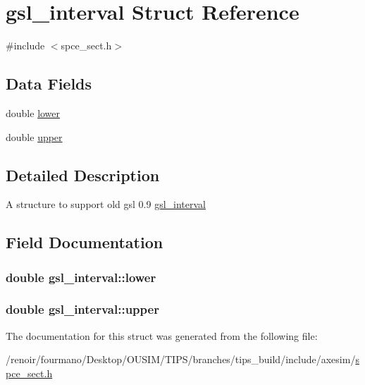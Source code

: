 \hypertarget{structgsl__interval}{
\section{gsl\_\-interval Struct Reference}
\label{structgsl__interval}
}


{\ttfamily \#include $<$spce\_\-sect.h$>$}\subsection*{Data Fields}
\begin{DoxyCompactItemize}
\item 
double \hyperlink{structgsl__interval_a3c4f4177152922856822282b1a9b47f6}{lower}
\item 
double \hyperlink{structgsl__interval_a29f7fc81635f7fc2896c524b48cb7640}{upper}
\end{DoxyCompactItemize}


\subsection{Detailed Description}
A structure to support old gsl 0.9 \hyperlink{structgsl__interval}{gsl\_\-interval} 

\subsection{Field Documentation}
\hypertarget{structgsl__interval_a3c4f4177152922856822282b1a9b47f6}{
\subsubsection[{lower}]{\setlength{\rightskip}{0pt plus 5cm}double {\bf gsl\_\-interval::lower}}}
\label{structgsl__interval_a3c4f4177152922856822282b1a9b47f6}
\hypertarget{structgsl__interval_a29f7fc81635f7fc2896c524b48cb7640}{
\subsubsection[{upper}]{\setlength{\rightskip}{0pt plus 5cm}double {\bf gsl\_\-interval::upper}}}
\label{structgsl__interval_a29f7fc81635f7fc2896c524b48cb7640}


The documentation for this struct was generated from the following file:\begin{DoxyCompactItemize}
\item 
/renoir/fourmano/Desktop/OUSIM/TIPS/branches/tips\_\-build/include/axesim/\hyperlink{spce__sect_8h}{spce\_\-sect.h}\end{DoxyCompactItemize}
